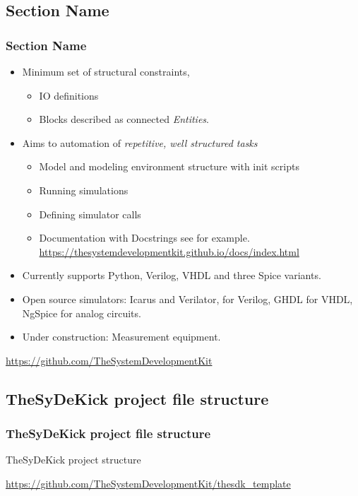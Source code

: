 \documentclass{sdkslides}
\newcommand{\sectname}{Section Name}
\begin{document}
\subsection*{\sectname}
\begin{frame}[t]
    \frametitle{\sectname}
    \begin{itemize}
        \item Minimum set of structural constraints, 
            \begin{itemize}
                \item IO definitions
                \item Blocks described as connected \emph{Entities}.
            \end{itemize}
        \item Aims to automation of \emph{repetitive, well structured tasks}
            \begin{itemize}
                \item Model and modeling environment structure with init scripts
                \item Running simulations
                \item Defining simulator calls
                \item Documentation with Docstrings see for
                    example. {\tiny
                    \url{https://thesystemdevelopmentkit.github.io/docs/index.html}}
            \end{itemize}
        \item Currently supports Python, Verilog, VHDL and three Spice
            variants.
        \item Open source simulators: Icarus and Verilator, for Verilog, GHDL
            for VHDL, NgSpice for analog
            circuits.
        \item Under construction: Measurement equipment.
    \end{itemize}
    {\tiny \url{https://github.com/TheSystemDevelopmentKit}}
\end{frame}

\renewcommand{\sectionname}{TheSyDeKick project file structure}
\subsection*{\sectionname}
\begin{frame}[t]
    \frametitle{\sectionname}
    \begin{block}{TheSyDeKick project structure}
    \begin{minipage}[t]{0.3\textwidth}
    \parbox{\textwidth}{
    }
    \end{minipage}
    \end{block}
    {\tiny \url{https://github.com/TheSystemDevelopmentKit/thesdk_template}}
\end{frame}
\end{document}
